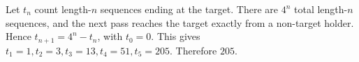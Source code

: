 Let $t_n$ count length-$n$ sequences ending at the target. There are $4^n$ total length-$n$ sequences, and the next pass reaches the target exactly from a non-target holder. Hence $t_{n+1}=4^n-t_n$, with $t_0=0$. This gives $t_1=1,t_2=3,t_3=13,t_4=51,t_5=205$. Therefore $\boxed{205}$.
